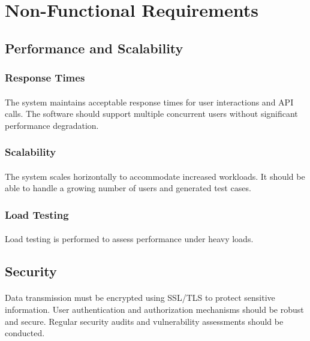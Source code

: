\documentclass{article}
\begin{document}

\section{Non-Functional Requirements}
\subsection{Performance and Scalability}
\subsubsection{Response Times}
\paragraph{}
The system maintains acceptable response times for user interactions and API calls.
The software should support multiple concurrent users without significant
performance degradation.

\subsubsection{Scalability}
\paragraph{}
The system scales horizontally to accommodate increased workloads.
It should be able to handle a growing number of users and generated test cases.

\subsubsection{Load Testing}
\paragraph{}
Load testing is performed to assess performance under heavy loads.

\subsection{Security}
\paragraph{}
Data transmission must be encrypted using SSL/TLS to protect sensitive information.
User authentication and authorization mechanisms should be robust and secure.
Regular security audits and vulnerability assessments should be conducted.
\end{document}
